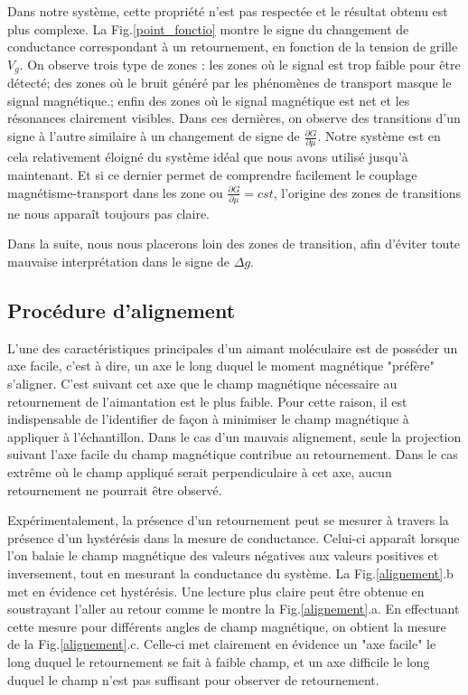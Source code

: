 Dans notre système, cette propriété n'est pas respectée et le résultat obtenu est plus complexe. La Fig.\ref{point_fonctio} montre le signe du changement de conductance correspondant à un retournement, en fonction de la tension de grille $V_g$. On observe trois type de zones : les zones où le signal est trop faible pour être détecté; des zones où le bruit généré par les phénomènes de transport masque le signal magnétique.; enfin des zones où le signal magnétique est net et les résonances clairement visibles. Dans ces dernières, on observe des transitions d'un signe à l'autre similaire à un changement de signe de $\frac{\partial G}{\partial \mu}$. Notre système est en cela relativement éloigné du système idéal que nous avons utilisé jusqu'à maintenant. Et si ce dernier permet de comprendre facilement le couplage magnétisme-transport dans les zone ou $\frac{\partial G}{\partial \mu} = cst$, l'origine des zones de transitions ne nous apparaît toujours pas claire.

Dans la suite, nous nous placerons loin des zones de transition, afin d'éviter toute mauvaise interprétation dans le signe de $\Delta g$.


\subsection{Procédure d'alignement}

L'une des caractéristiques principales d'un aimant moléculaire est de posséder un axe facile, c'est à dire, un axe le long duquel le moment magnétique "préfère" s'aligner. C'est suivant cet axe que le champ magnétique nécessaire au retournement de l'aimantation est le plus faible. Pour cette raison, il est indispensable de l'identifier de façon à minimiser le champ magnétique à appliquer à l'échantillon. Dans le cas d'un mauvais alignement, seule la projection suivant l'axe facile du champ magnétique contribue au retournement. Dans le cas extrême où le champ appliqué serait perpendiculaire à cet axe, aucun retournement ne pourrait être observé.

Expérimentalement, la présence d'un retournement peut se mesurer à travers la présence d'un hystérésis dans la mesure de conductance. Celui-ci apparaît lorsque l'on balaie le champ magnétique des valeurs négatives aux valeurs positives et inversement, tout en mesurant la conductance du système. La Fig.\ref{alignement}.b met en évidence cet hystérésis. Une lecture plus claire peut être obtenue en soustrayant l'aller au retour comme le montre la Fig.\ref{alignement}.a. En effectuant cette mesure pour différents angles de champ magnétique, on obtient la mesure de la Fig.\ref{alignement}.c. Celle-ci met clairement en évidence un "axe facile" le long duquel le retournement se fait à faible champ, et un axe difficile le long duquel le champ n'est pas suffisant pour observer de retournement.

